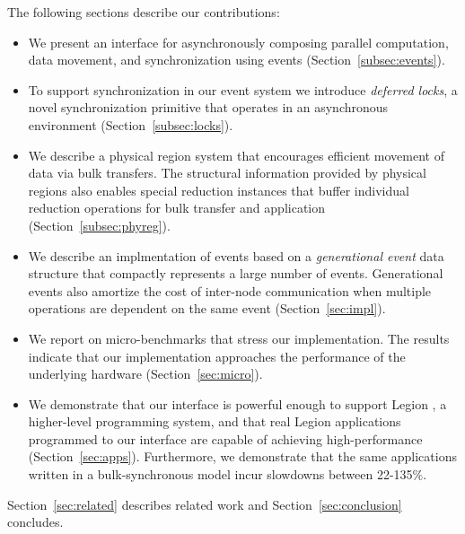 The following sections describe our contributions:
\begin{itemize} \itemsep1pt \parskip0pt 
\item We present an interface for asynchronously composing
parallel computation, data movement, and synchronization using events (Section~\ref{subsec:events}).  

\item To support synchronization in our event system we introduce {\em deferred locks}, 
a novel synchronization primitive that operates in an asynchronous environment (Section~\ref{subsec:locks}).

\item We describe a physical region system that encourages efficient movement of data
via bulk transfers.  The structural information provided by physical regions also enables
special reduction instances that buffer individual reduction operations for bulk
transfer and application (Section~\ref{subsec:phyreg}).

\item We describe an implmentation of events based on a {\em generational event}
data structure that compactly represents a large number of events.  Generational
events also amortize the cost of inter-node communication when multiple operations are dependent
on the same event (Section~\ref{sec:impl}).

\item We report on micro-benchmarks that stress
our implementation.  The results indicate that our implementation approaches the performance of
the underlying hardware (Section~\ref{sec:micro}).

\item We demonstrate that our interface is powerful enough to support Legion \cite{Legion12}, a higher-level
programming system, and that real Legion applications programmed to our interface
are capable of achieving high-performance (Section~\ref{sec:apps}).  Furthermore, we demonstrate
that the same applications written in a bulk-synchronous model incur slowdowns between 22-135\%.
\end{itemize}

Section~\ref{sec:related} describes related work and Section~\ref{sec:conclusion}
concludes.

